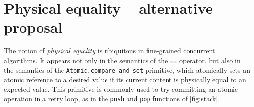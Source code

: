 %
%
%

\section{Physical equality -- alternative proposal}

The notion of \emph{physical equality} is ubiquitous in fine-grained concurrent algorithms.
It appears not only in the semantics of the \texttt{==} operator, but also in the semantics of the \texttt{Atomic.compare_and_set} primitive, which atomically sets an atomic reference to a desired value if its current content is physically equal to an expected value.
This primitive is commonly used to try committing an atomic operation in a retry loop, as in the \texttt{push} and \texttt{pop} functions of \cref{fig:stack}.

